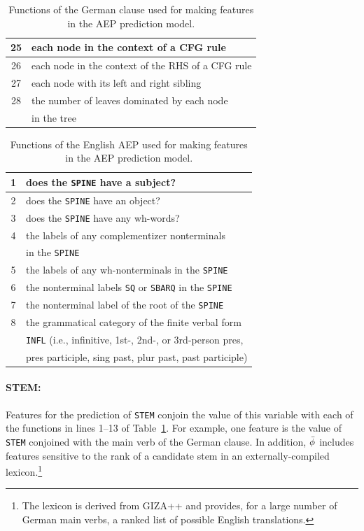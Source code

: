 \documentclass[11pt]{report}
\theoremstyle{plain}
\begin{document}
{\begin{table}[!h]
\begin{center}
\begin{small}
\begin{tabular}{|c|l|}
\hline
25 & each node in the context of a CFG rule \\
\hline
26 & each node in the context of the RHS of a CFG rule \\
\hline
27 & each node with its left and right sibling \\
\hline
28 & the number of leaves dominated by each node \\
&in the tree \\
\hline
\end{tabular}
\end{small}
\end{center}
\caption{Functions of the German clause used for making features in
the AEP prediction model.}
\label{GERfunc}
\end{table}

\begin{table}[!h]
\begin{center}
\begin{small}
\begin{tabular}{|c|l|}
\hline
1 & does the {\tt SPINE} have a subject? \\
\hline
2 & does the {\tt SPINE} have an object? \\
\hline
3 & does the {\tt SPINE} have any wh-words? \\
\hline
4 & the labels of any complementizer nonterminals \\
& in the {\tt SPINE} \\
\hline
5 & the labels of any wh-nonterminals in the {\tt SPINE} \\
\hline
6 & the nonterminal labels {\tt SQ} or {\tt SBARQ} in the {\tt SPINE} \\
\hline
7 & the nonterminal label of the root of the {\tt SPINE} \\
\hline
8 & the grammatical category of the finite verbal form\\
 &  {\tt INFL} (i.e., infinitive, 1st-, 2nd-, or 3rd-person pres,\\
& pres participle, sing past, plur past, past participle) \\
\hline
\end{tabular}
\end{small}
\end{center}
\caption{Functions of the English AEP used for making features
in the AEP prediction model.}
\label{AEPfunc}
\end{table}

\paragraph{STEM:} 
Features for the prediction of {\tt STEM} conjoin
the value of this variable with each of the functions in lines 1--13
of Table~\ref{GERfunc}.  For example, one feature is the value of {\tt
STEM} conjoined with the main verb of the German clause. In addition,
$\bar{\phi}$ includes features sensitive to the rank of a
candidate stem in an externally-compiled lexicon.\footnote{The lexicon
is derived from GIZA++ and provides, for a large number of German main
verbs, a ranked list of possible English translations.}

}
\end{document}
